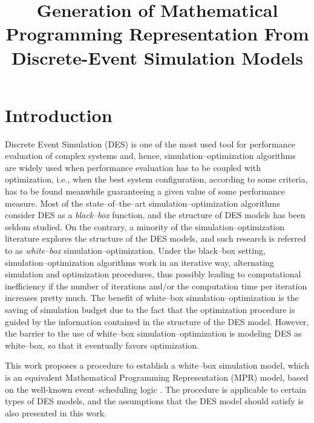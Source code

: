 \documentclass[]{interact}
\theoremstyle{plain}%
\theoremstyle{definition}
\theoremstyle{remark}
\begin{document}

\title{Generation of Mathematical Programming Representation From Discrete-Event Simulation Models}
\maketitle
\begin{abstract}

\end{abstract}

\section{Introduction}
Discrete Event Simulation (DES) is one of the most used tool for performance evaluation of %
complex systems and, hence, simulation--optimization algorithms are widely used %
when performance evaluation has to be coupled with optimization, i.e., when the best system configuration, according to some criteria, has to be found meanwhile guaranteeing a given value of some performance measure.  
Most of the state--of--the--art simulation--optimization algorithms consider DES as a \textit{black--box} function, and the structure of DES models has been seldom studied. On the contrary, a minority of the simulation--optimization literature explores the structure of the DES models, and %
such research is referred to as \textit{white--box} simulation--optimization. 
Under the black--box setting, simulation--optimization algorithms work in an iterative way, alternating simulation and optimization procedures, 
thus possibly leading to computational inefficiency if the number of iterations and/or the computation time per iteration increases pretty much. 
The benefit of white--box simulation--optimization is the saving of simulation budget due to the fact that %
the optimization procedure is guided by the information contained in the structure of the DES model. However, the barrier to the use of white--box simulation--optimization is modeling DES as white--box, so that it eventually favors optimization. 

This work proposes a procedure to establish a white--box simulation model, which is an equivalent Mathematical Programming Representation (MPR) model, based on the well-known event--scheduling logic \citep{law2014simulation}. %
The procedure is applicable to certain types of DES models, and the assumptions that the DES model should satisfy is also presented in this work.
\end{document}
